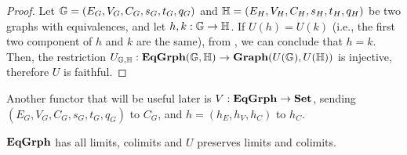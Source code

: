 \begin{proof}
    Let $\mathbb{G} = (E_G, V_G, C_G, s_G, t_G, q_G)$ and $\mathbb{H} = (E_H, V_H, C_H, s_H, t_H, q_H)$  be two graphs with equivalences, and let $h, k : \mathbb{G \to H}$.
    If $U(h) = U(k)$ (i.e., the first two component of $h$ and $k$ are the same), from , we can conclude that $h = k$. Then, the restriction $U_{\mathbb{G, H}} : \mathbf{EqGrph}(\mathbb{G, H}) \to \mathbf{Graph}(U(\mathbb{G}), U(\mathbb{H}))$ is injective, therefore $U$ is faithful.
\end{proof}

Another functor that will be useful later is $V: \mathbf{EqGrph} \to \mathbf{Set}$, sending $(E_G, V_G, C_G, s_G, t_G, q_G)$ to $C_G$, and $h = (h_E, h_V, h_C)$ to $h_C$.

\begin{prop}\label{prop:eqgrph_complete}
    $\mathbf{EqGrph}$ has all limits, colimits and $U$ preserves limits and colimits.
\end{prop}

